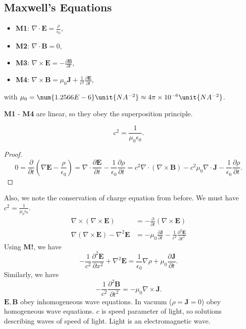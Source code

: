 \subsection{Maxwell's Equations}
\leavevmode
\begin{theorem}
    \leavevmode
    \begin{itemize}
        \item \textbf{M1}: \(\nabla \cdot \mathbf{E}  = \frac{\rho}{\epsilon_0}\),
        \item \textbf{M2}: \(\nabla \cdot \mathbf{B}  = 0\),
        \item \textbf{M3}: \(\nabla \times \mathbf{E} = - \frac{\partial \mathbf{B}}{\partial t} \),
        \item \textbf{M4}: \(\nabla \times \mathbf{B} = \mu_0 \mathbf{J} + \frac{1}{c^2} \frac{\partial \mathbf{E} }{\partial t}\),
    \end{itemize}
    with \(\mu_0 = \num{1.2566E-6}\unit{NA^{-2}}\approx 4\pi\times 10^{-6}\unit{NA^{-2}}\).
\end{theorem}
\begin{remark}
    \textbf{M1} - \textbf{M4} are linear, so they obey the superposition principle.
\end{remark}
\begin{proposition}
    \leavevmode
    \[
        c^2 = \frac{1}{\mu_0\epsilon_0}.
    \]
\end{proposition}
\begin{proof}
    \[
        0 = \frac{\partial }{\partial t} (\nabla \mathbf{E} - \frac{\rho}{\epsilon_0}) = \nabla \cdot \frac{\partial \mathbf{E} }{\partial t} - \frac{1}{\epsilon_0}\frac{\partial \rho}{\partial t} = c^2 \nabla  \cdot (\nabla  \times \mathbf{B} )-c^2\mu_{0}\nabla \cdot \mathbf{J} -\frac{1}{\epsilon_0}\frac{\partial \rho}{\partial t} .
    \]
\end{proof}
Also, we note the conservation of charge equation from before. We must have \(c^2 = \frac{1}{\mu_0 \epsilon_0}\).
\begin{align*}
    \nabla \times (\nabla \times \mathbf{E} ) &= - \frac{\partial }{\partial t} (\nabla \times \mathbf{E} )\\
    \nabla (\nabla\times \mathbf{E}) - \nabla ^2 \mathbf{E}  &= - \mu_0 \frac{\partial \mathbf{J}}{\partial t} - \frac{1}{c^2}\frac{\partial^2 \mathbf{E} }{\partial t^2}  
\end{align*}
Using \textbf{M!}, we have
\[
    -\frac{1}{c^{2}}\frac{\partial^2\mathbf{E}}{\partial x^2} +\nabla ^2 \mathbf{E} =\frac{1}{\epsilon_0}\nabla \rho + \mu_0 \frac{\partial \mathbf{J}}{\partial t} .
\] 
Similarly, we have
\[
    -\frac{1}{c^2}\frac{\partial^2 \mathbf{B}}{\partial t^2} = - \mu_0 \nabla \times \mathbf{J} .
\]
\(\mathbf{E},\mathbf{B} \) obey inhomogeneous wave equations. In vacuum (\(\rho = \mathbf{J} = 0\)) obey homogeneous wave equations. \(c\) is speed parameter of light, so solutions describing waves of speed of light. Light is an electromagnetic wave.
